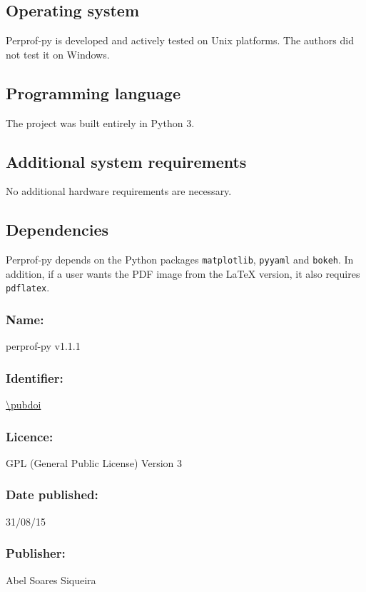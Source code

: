 \subsection*{Operating system}

    Perprof-py is developed and actively tested on Unix platforms.
    The authors did not test it on Windows.

\subsection*{Programming language}

    The project was built entirely in Python 3.

\subsection*{Additional system requirements}

    No additional hardware requirements are necessary.

\subsection*{Dependencies}

    Perprof-py depends on the Python packages \texttt{matplotlib}, \texttt{pyyaml} and \texttt{bokeh}.
    In addition, if a user wants the PDF image from the LaTeX
    version, it also requires \texttt{pdflatex}.

\Archive

    \subsubsection*{Name:} perprof-py v1.1.1

    \subsubsection*{Identifier:} \url{\pubdoi}

    \subsubsection*{Licence:} GPL (General Public License) Version 3

    \subsubsection*{Date published:} 31/08/15

    \subsubsection*{Publisher:} Abel Soares Siqueira

